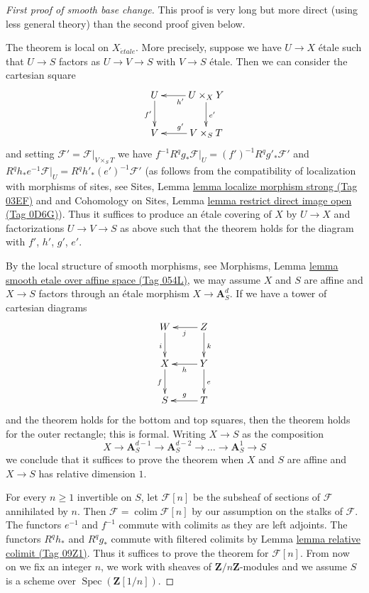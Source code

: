 \documentclass{amsart}
\theoremstyle{plain}
\theoremstyle{definition}
\theoremstyle{remark}
\numberwithin{equation}{subsection}
\def\colim{\mathop{\mathrm{colim}}\nolimits}
\def\Spec{\mathop{\mathrm{Spec}}}
\def\etale{{\acute{e}tale}}
\begin{document}
\begin{proof}[First proof of smooth base change]
This proof is very long but more direct (using less general theory)
than the second proof given below.

\medskip\noindent
The theorem is local on $X_\etale$. More precisely, suppose we have
$U \to X$ \'etale such that $U \to S$ factors as $U \to V \to S$
with $V \to S$ \'etale. Then we can consider the cartesian square
$$
\xymatrix{
U \ar[d]_{f'} & U \times_X Y \ar[l]^{h'} \ar[d]^{e'} \\
V & V \times_S T \ar[l]_{g'}
}
$$
and setting $\mathcal{F}' = \mathcal{F}|_{V \times_S T}$
we have $f^{-1}R^qg_*\mathcal{F}|_U = (f')^{-1}R^qg'_*\mathcal{F}'$
and $R^qh_*e^{-1}\mathcal{F}|_U = R^qh'_*(e')^{-1}\mathcal{F}'$
(as follows from the compatibility of localization with morphisms of sites, see
Sites, Lemma \href{https://stacks.math.columbia.edu/tag/03EF}{lemma localize morphism strong (Tag 03EF)} and
and
Cohomology on Sites, Lemma
\href{https://stacks.math.columbia.edu/tag/0D6G}{lemma restrict direct image open (Tag 0D6G)}).
Thus it suffices to produce an \'etale covering of $X$ by
$U \to X$ and factorizations $U \to V \to S$
as above such that the theorem holds for the diagram with
$f'$, $h'$, $g'$, $e'$.

\medskip\noindent
By the local structure of smooth morphisms, see
Morphisms, Lemma \href{https://stacks.math.columbia.edu/tag/054L}{lemma smooth etale over affine space (Tag 054L)},
we may assume $X$ and $S$ are affine and $X \to S$
factors through an \'etale morphism $X \to \mathbf{A}^d_S$.
If we have a tower of cartesian diagrams
$$
\xymatrix{
W \ar[d]_i & Z \ar[l]^j \ar[d]^k \\
X \ar[d]_f & Y \ar[l]^h \ar[d]^e \\
S & T \ar[l]_g
}
$$
and the theorem holds for the bottom and top squares, then
the theorem holds for the outer rectangle; this is formal.
Writing $X \to S$ as the composition
$$
X \to \mathbf{A}^{d - 1}_S \to \mathbf{A}^{d - 2}_S \to \ldots \to
\mathbf{A}^1_S \to S
$$
we conclude that it suffices to prove the theorem when $X$ and $S$
are affine and $X \to S$ has relative dimension $1$.

\medskip\noindent
For every $n \geq 1$ invertible on $S$, let $\mathcal{F}[n]$
be the subsheaf of sections of $\mathcal{F}$ annihilated by $n$. Then
$\mathcal{F} = \colim \mathcal{F}[n]$ by our assumption on
the stalks of $\mathcal{F}$. The functors $e^{-1}$ and $f^{-1}$
commute with colimits as they are left adjoints. The functors
$R^qh_*$ and $R^qg_*$ commute with filtered colimits by
Lemma \href{https://stacks.math.columbia.edu/tag/09Z1}{lemma relative colimit (Tag 09Z1)}.
Thus it suffices to prove the theorem for $\mathcal{F}[n]$.
From now on we fix an integer $n$, we work with
sheaves of $\mathbf{Z}/n\mathbf{Z}$-modules and
we assume $S$ is a scheme over $\Spec(\mathbf{Z}[1/n])$.


\end{proof}
\end{document}
